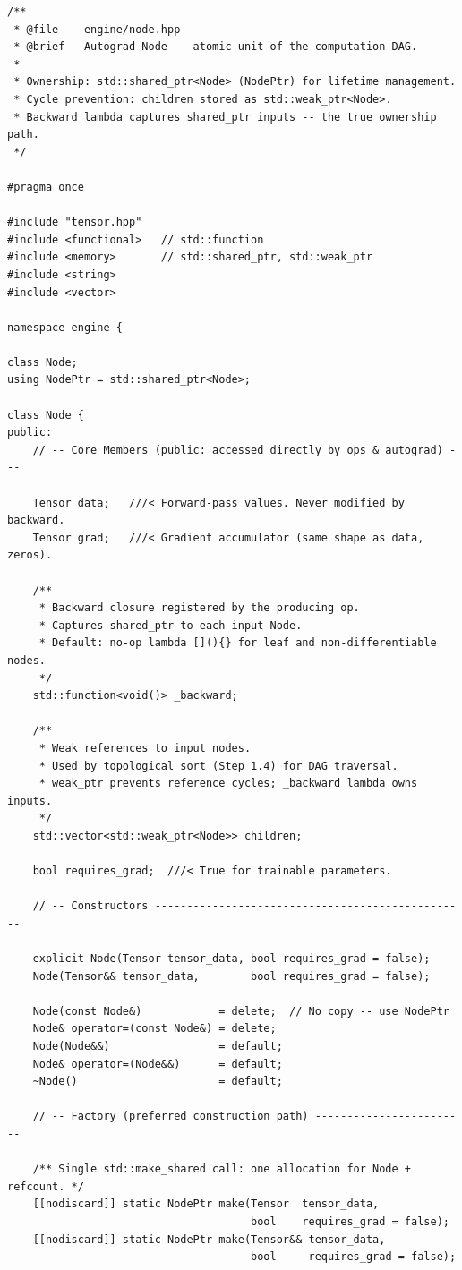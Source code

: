 \documentclass[12pt, a4paper]{article}
\begin{document}
\begin{lstlisting}[caption={\texttt{engine/node.hpp} - complete header}]
/**
 * @file    engine/node.hpp
 * @brief   Autograd Node -- atomic unit of the computation DAG.
 *
 * Ownership: std::shared_ptr<Node> (NodePtr) for lifetime management.
 * Cycle prevention: children stored as std::weak_ptr<Node>.
 * Backward lambda captures shared_ptr inputs -- the true ownership path.
 */

#pragma once

#include "tensor.hpp"
#include <functional>   // std::function
#include <memory>       // std::shared_ptr, std::weak_ptr
#include <string>
#include <vector>

namespace engine {

class Node;
using NodePtr = std::shared_ptr<Node>;

class Node {
public:
    // -- Core Members (public: accessed directly by ops & autograd) ---

    Tensor data;   ///< Forward-pass values. Never modified by backward.
    Tensor grad;   ///< Gradient accumulator (same shape as data, zeros).

    /**
     * Backward closure registered by the producing op.
     * Captures shared_ptr to each input Node.
     * Default: no-op lambda [](){} for leaf and non-differentiable nodes.
     */
    std::function<void()> _backward;

    /**
     * Weak references to input nodes.
     * Used by topological sort (Step 1.4) for DAG traversal.
     * weak_ptr prevents reference cycles; _backward lambda owns inputs.
     */
    std::vector<std::weak_ptr<Node>> children;

    bool requires_grad;  ///< True for trainable parameters.

    // -- Constructors -------------------------------------------------

    explicit Node(Tensor tensor_data, bool requires_grad = false);
    Node(Tensor&& tensor_data,        bool requires_grad = false);

    Node(const Node&)            = delete;  // No copy -- use NodePtr
    Node& operator=(const Node&) = delete;
    Node(Node&&)                 = default;
    Node& operator=(Node&&)      = default;
    ~Node()                      = default;

    // -- Factory (preferred construction path) ------------------------

    /** Single std::make_shared call: one allocation for Node + refcount. */
    [[nodiscard]] static NodePtr make(Tensor  tensor_data,
                                      bool    requires_grad = false);
    [[nodiscard]] static NodePtr make(Tensor&& tensor_data,
                                      bool     requires_grad = false);


\end{lstlisting}
\end{document}
